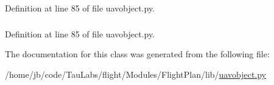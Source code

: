 \-Definition at line 85 of file uavobject.\-py.

\hypertarget{classuavobject_1_1_u_a_v_object_field_a0fb06dc8a6e619248bd22427a2263e6a}{
\subsubsection[{value}]{}}\label{classuavobject_1_1_u_a_v_object_field_a0fb06dc8a6e619248bd22427a2263e6a}


\-Definition at line 85 of file uavobject.\-py.



\-The documentation for this class was generated from the following file\-:\begin{DoxyCompactItemize}
\item 
/home/jb/code/\-Tau\-Labs/flight/\-Modules/\-Flight\-Plan/lib/\hyperlink{uavobject_8py}{uavobject.\-py}\end{DoxyCompactItemize}
